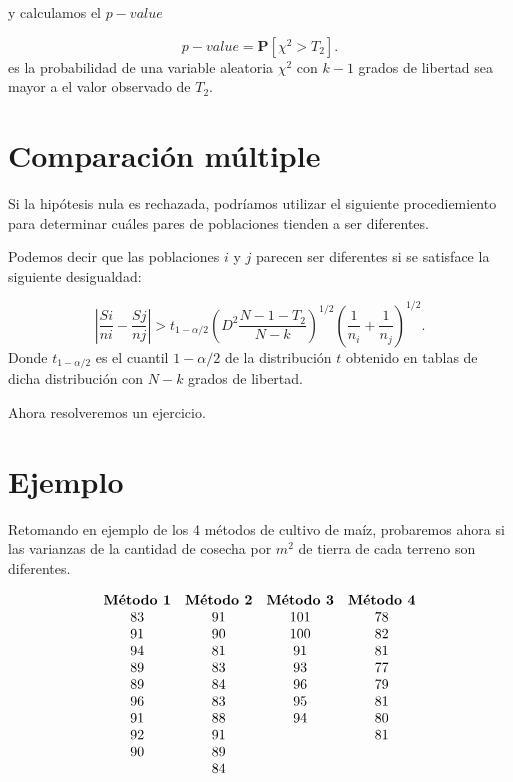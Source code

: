 \documentclass[
  a4paper,
  oneside,
  openany]{book}
\begin{document}
y calculamos el \(p-value\)

\[p-value= \mathbf{P}\left[\chi^2>T_{2}\right].\]
es la probabilidad de una variable aleatoria \(\chi^2\) con \(k-1\) grados de libertad sea mayor a el valor observado de \(T_2\).

\hypertarget{comparaciuxf3n-muxfaltiple}{%
\section{Comparación múltiple}\label{comparaciuxf3n-muxfaltiple}}

Si la hipótesis nula es rechazada, podríamos utilizar el siguiente procediemiento para determinar cuáles pares de poblaciones tienden a ser diferentes.

Podemos decir que las poblaciones \(i\) y \(j\) parecen ser diferentes si se satisface la siguiente desigualdad:

\[\left|\frac{Si}{ni}- \frac{Sj}{nj}\right|> t_{1-\alpha/2}\left(D^2\frac{N-1-T_{2}}{N-k}\right)^{1/2}\left(\frac{1}{n_i}+\frac{1}{n_j}\right)^{1/2}.\]
Donde \(t_{1-\alpha/2}\) es el cuantil \(1-\alpha/2\) de la distribución \(t\) obtenido en tablas de dicha distribución con \(N-k\) grados de libertad.

Ahora resolveremos un ejercicio.

\hypertarget{ejemplo-9}{%
\section{Ejemplo}\label{ejemplo-9}}

Retomando en ejemplo de los 4 métodos de cultivo de maíz, probaremos ahora si las varianzas de la cantidad de cosecha por \(m^2\) de tierra de cada terreno son diferentes.

\[
\begin{array}{c c c c} 
\textbf{Método 1} & \textbf{Método 2} & \textbf{Método 3} & \textbf{Método 4}\\
83&91&101&78\\
91&90&100&82\\
94&81&91&81\\
89&83&93&77\\
89&84&96&79\\
96&83&95&81\\
91&88&94&80\\
92&91&  &81\\
90&89&  &\\
  &84&  &\\
\end{array}
\]
\end{document}
